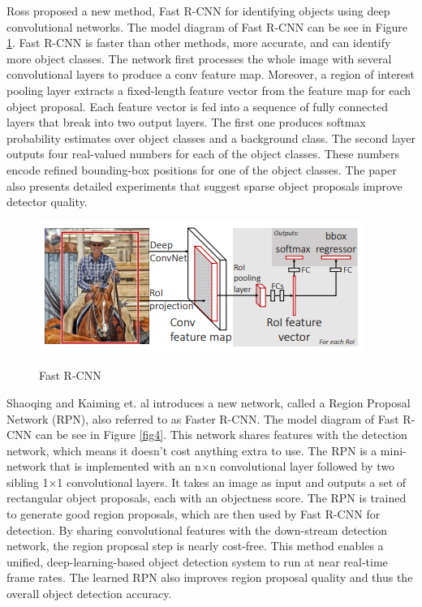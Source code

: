 \documentclass[conference]{IEEEtran}
\begin{document}
Ross \cite{3} proposed a new method, Fast R-CNN  for identifying objects using deep convolutional networks. The model diagram of Fast R-CNN can be see in Figure \ref{fig3}. Fast R-CNN is faster than other methods, more accurate, and can identify more object classes. The network first processes the whole image with several convolutional layers to produce a conv feature map. Moreover, a region of interest pooling layer extracts a fixed-length feature vector from the feature map for each object proposal. Each feature vector is fed into a sequence of fully connected layers that break into two output layers. The first one produces softmax probability estimates over object classes and a background class. The second layer outputs four real-valued numbers for each of the object classes. These numbers encode refined bounding-box positions for one of the object classes. The paper also presents detailed experiments that suggest sparse object proposals improve detector quality.
\begin{figure}[h]
    \centering
    \includegraphics[width=\linewidth]{3..png}\\
    \caption{Fast R-CNN}
    \label{fig3}
\end{figure}
\newpage
Shaoqing and Kaiming et. al \cite{1} introduces a new network, called a Region Proposal Network (RPN), also referred to as Faster R-CNN. The model diagram of Fast R-CNN can be see in Figure \ref{fig4}. This network shares features with the detection network, which means it doesn't cost anything extra to use. The RPN is a mini-network that is implemented with an n×n convolutional layer followed by two sibling 1×1 convolutional layers. It takes an image as input and outputs a set of rectangular object proposals, each with an objectness score. The RPN is trained to generate good region proposals, which are then used by Fast R-CNN for detection. By sharing convolutional features with the down-stream detection network, the region proposal step is nearly cost-free. This method enables a unified, deep-learning-based object detection system to run at near real-time frame rates. The learned RPN also improves region proposal quality and thus the overall object detection accuracy. 
\end{document}
